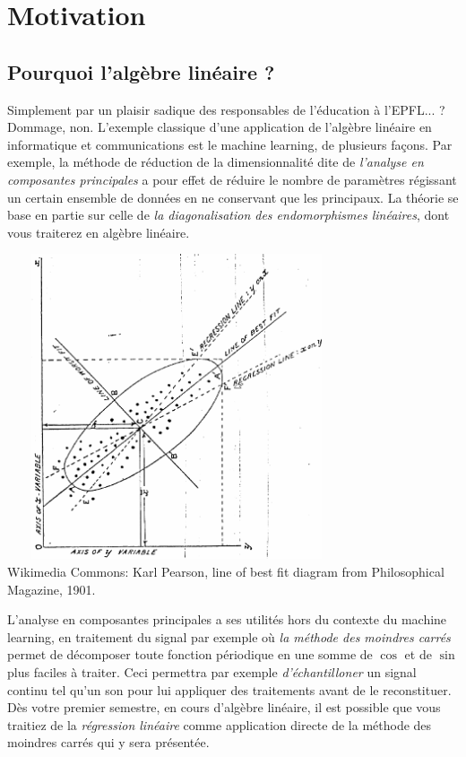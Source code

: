 \documentclass{article}
\begin{document}
\section{Motivation}
\subsection{Pourquoi l'algèbre linéaire ?}
Simplement par un plaisir sadique des responsables de l'éducation à l'EPFL... ?\\

Dommage, non. L'exemple classique d'une application de l'algèbre linéaire en informatique et communications est le machine learning, de plusieurs façons. Par exemple, la méthode de réduction de la dimensionnalité dite de \textit{l'analyse en composantes principales} a pour effet de réduire le nombre de paramètres régissant un certain ensemble de données en ne conservant que les principaux. La théorie se base en partie sur celle de \textit{la diagonalisation des endomorphismes linéaires}, dont vous traiterez en algèbre linéaire.
\begin{center}
    \includegraphics[width=10cm, height=9cm]{pearson}\\
    Wikimedia Commons: Karl Pearson, line of best fit diagram from Philosophical Magazine, 1901.
\end{center}
L'analyse en composantes principales a ses utilités hors du contexte du machine learning, en traitement du signal par exemple où \textit{la méthode des moindres carrés} permet de décomposer toute fonction périodique en une somme de $\cos$ et de $\sin$ plus faciles à traiter. Ceci permettra par exemple \textit{d'échantilloner} un signal continu tel qu'un son pour lui appliquer des traitements avant de le reconstituer. Dès votre premier semestre, en cours d'algèbre linéaire, il est possible que vous traitiez de la \textit{régression linéaire} comme application directe de la méthode des moindres carrés qui y sera présentée.\\
\end{document}
